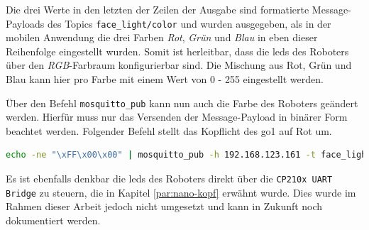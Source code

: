 \noindent Die drei Werte in den letzten der Zeilen der Ausgabe sind formatierte Message-Payloads des Topics \texttt{face\_light/color}
und wurden ausgegeben, als in der mobilen Anwendung die drei Farben \emph{Rot}, \emph{Grün} und \emph{Blau} in eben dieser
Reihenfolge eingestellt wurden.
Somit ist herleitbar, dass die \glspl{led} des Roboters über den \emph{RGB}-Farbraum konfigurierbar sind.
Die Mischung aus Rot, Grün und Blau kann hier pro Farbe mit einem Wert von \num{0} - \num{255} eingestellt werden.

Über den Befehl \texttt{mosquitto\_pub} kann nun auch die Farbe des Roboters geändert werden.
Hierfür muss nur das Versenden der Message-Payload in binärer Form beachtet werden.
Folgender Befehl stellt das Kopflicht des \gls{go1} auf Rot um.

\begin{lstlisting}[language=Bash]
echo -ne "\xFF\x00\x00" | mosquitto_pub -h 192.168.123.161 -t face_light/color -s
\end{lstlisting}

\noindent Es ist ebenfalls denkbar die \glspl{led} des Roboters direkt über die \texttt{CP210x UART Bridge} zu steuern, die in Kapitel
\ref{par:nano-kopf} erwähnt wurde.
Dies wurde im Rahmen dieser Arbeit jedoch nicht umgesetzt und kann in Zukunft noch dokumentiert werden.
